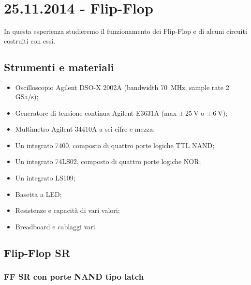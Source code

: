 \section{25.11.2014 - Flip-Flop}

In questa esperienza studieremo il funzionamento dei Flip-Flop e di alcuni circuiti costruiti con essi.

\subsection*{Strumenti e materiali}

\begin{itemize} [noitemsep]
	\item Oscilloscopio Agilent DSO-X 2002A (bandwidth \SI{70}{\mega\hertz}, sample rate \num{2} GSa/s);
	\item Generatore di tensione continua Agilent E3631A (max $\pm \, \SI{25}{\volt}$ o $\pm \, \SI{6}{\volt}$);
	\item Multimetro Agilent 34410A a sei cifre e mezza;
	\item Un integrato 7400, composto di quattro porte logiche TTL NAND; %
	\item Un integrato 74LS02, composto di quattro porte logiche NOR;
	\item Un integrato LS109;
	\item Basetta a LED;		
	\item Resistenze e capacità di vari valori;
	\item Breadboard e cablaggi vari.
\end{itemize}

\subsection{Flip-Flop SR}

\subsubsection*{FF SR con porte NAND tipo latch}


